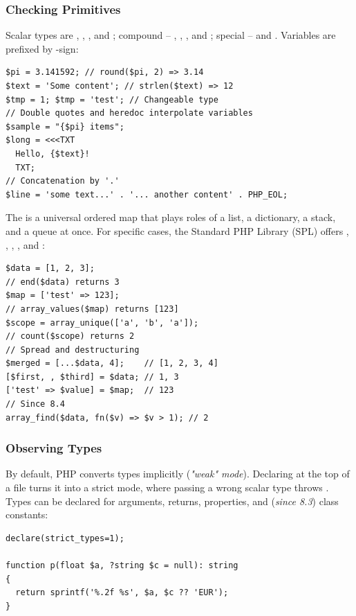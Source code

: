 \subsubsection{Checking Primitives} \label{php-prim}

Scalar types are , , , and ; compound -- ,
, , and ; special --  and .
Variables are prefixed by \q{\$}-sign:

\begin{lstlisting}
$pi = 3.141592; // round($pi, 2) => 3.14
$text = 'Some content'; // strlen($text) => 12
$tmp = 1; $tmp = 'test'; // Changeable type
// Double quotes and heredoc interpolate variables
$sample = "{$pi} items";
$long = <<<TXT
  Hello, {$text}!
  TXT;
// Concatenation by '.'
$line = 'some text...' . '... another content' . PHP_EOL;
\end{lstlisting}

\noindent The  is a universal ordered map that plays roles of a list, a dictionary, a
stack, and a queue at once. For specific cases, the Standard PHP Library (SPL) offers
, , , , and :

\newpage
\begin{lstlisting}
$data = [1, 2, 3];
// end($data) returns 3
$map = ['test' => 123];
// array_values($map) returns [123]
$scope = array_unique(['a', 'b', 'a']);
// count($scope) returns 2
// Spread and destructuring
$merged = [...$data, 4];    // [1, 2, 3, 4]
[$first, , $third] = $data; // 1, 3
['test' => $value] = $map;  // 123
// Since 8.4
array_find($data, fn($v) => $v > 1); // 2
\end{lstlisting}


\subsubsection{Observing Types}

By default, PHP converts types implicitly (\emph{"weak" mode}). Declaring
 at the top of a file turns it into a strict mode, where passing
a wrong scalar type throws . Types can be declared for arguments, returns,
properties, and (\emph{since 8.3}) class constants:

\begin{lstlisting}
declare(strict_types=1);

function p(float $a, ?string $c = null): string
{
  return sprintf('%.2f %s', $a, $c ?? 'EUR');
}
\end{lstlisting}


